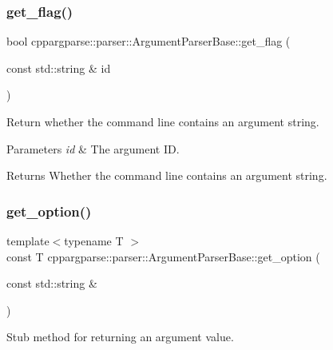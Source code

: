 \subsubsection{\texorpdfstring{get\+\_\+flag()}{get\_flag()}}
{\footnotesize\ttfamily bool cppargparse\+::parser\+::\+Argument\+Parser\+Base\+::get\+\_\+flag (\begin{DoxyParamCaption}\item[{const std\+::string \&}]{id }\end{DoxyParamCaption})\hspace{0.3cm}{\ttfamily [inline]}}



Return whether the command line contains an argument string. 


\begin{DoxyParams}{Parameters}
{\em id} & The argument ID.\\
\hline
\end{DoxyParams}
\begin{DoxyReturn}{Returns}
Whether the command line contains an argument string. 
\end{DoxyReturn}
\mbox{\label{classcppargparse_1_1parser_1_1ArgumentParserBase_a9b716b70f52707633faccdc3de63641c}} 
\subsubsection{\texorpdfstring{get\+\_\+option()}{get\_option()}\hspace{0.1cm}{\footnotesize\ttfamily [1/2]}}
{\footnotesize\ttfamily template$<$typename T $>$ \\
const T cppargparse\+::parser\+::\+Argument\+Parser\+Base\+::get\+\_\+option (\begin{DoxyParamCaption}\item[{const std\+::string \&}]{ }\end{DoxyParamCaption})\hspace{0.3cm}{\ttfamily [inline]}}



Stub method for returning an argument value. 


